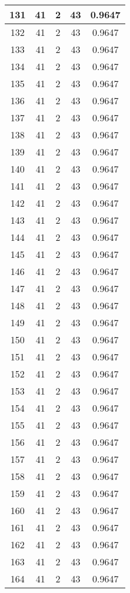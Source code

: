 \documentclass[letterpaper, 12pt]{article}
\begin{document}
\begin{longtable}{|c|c|c|c|c|}
\hline
131 & 41 & 2 & 43 & 0.9647 \\
\hline
132 & 41 & 2 & 43 & 0.9647 \\
\hline
133 & 41 & 2 & 43 & 0.9647 \\
\hline
134 & 41 & 2 & 43 & 0.9647 \\
\hline
135 & 41 & 2 & 43 & 0.9647 \\
\hline
136 & 41 & 2 & 43 & 0.9647 \\
\hline
137 & 41 & 2 & 43 & 0.9647 \\
\hline
138 & 41 & 2 & 43 & 0.9647 \\
\hline
139 & 41 & 2 & 43 & 0.9647 \\
\hline
140 & 41 & 2 & 43 & 0.9647 \\
\hline
141 & 41 & 2 & 43 & 0.9647 \\
\hline
142 & 41 & 2 & 43 & 0.9647 \\
\hline
143 & 41 & 2 & 43 & 0.9647 \\
\hline
144 & 41 & 2 & 43 & 0.9647 \\
\hline
145 & 41 & 2 & 43 & 0.9647 \\
\hline
146 & 41 & 2 & 43 & 0.9647 \\
\hline
147 & 41 & 2 & 43 & 0.9647 \\
\hline
148 & 41 & 2 & 43 & 0.9647 \\
\hline
149 & 41 & 2 & 43 & 0.9647 \\
\hline
150 & 41 & 2 & 43 & 0.9647 \\
\hline
151 & 41 & 2 & 43 & 0.9647 \\
\hline
152 & 41 & 2 & 43 & 0.9647 \\
\hline
153 & 41 & 2 & 43 & 0.9647 \\
\hline
154 & 41 & 2 & 43 & 0.9647 \\
\hline
155 & 41 & 2 & 43 & 0.9647 \\
\hline
156 & 41 & 2 & 43 & 0.9647 \\
\hline
157 & 41 & 2 & 43 & 0.9647 \\
\hline
158 & 41 & 2 & 43 & 0.9647 \\
\hline
159 & 41 & 2 & 43 & 0.9647 \\
\hline
160 & 41 & 2 & 43 & 0.9647 \\
\hline
161 & 41 & 2 & 43 & 0.9647 \\
\hline
162 & 41 & 2 & 43 & 0.9647 \\
\hline
163 & 41 & 2 & 43 & 0.9647 \\
\hline
164 & 41 & 2 & 43 & 0.9647 \\

\end{longtable}
\end{document}
